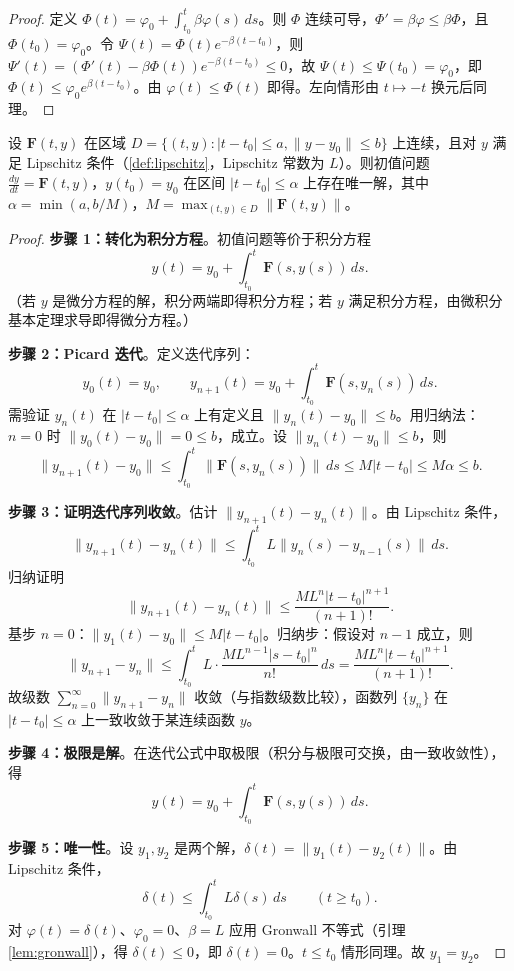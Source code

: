 \begin{proof}
定义 $\Phi(t) = \varphi_0 + \int_{t_0}^t \beta \varphi(s)\,ds$。则 $\Phi$ 连续可导，$\Phi' = \beta \varphi \le \beta \Phi$，且 $\Phi(t_0) = \varphi_0$。令 $\Psi(t) = \Phi(t) e^{-\beta(t-t_0)}$，则 $\Psi'(t) = (\Phi'(t) - \beta\Phi(t)) e^{-\beta(t-t_0)} \le 0$，故 $\Psi(t) \le \Psi(t_0) = \varphi_0$，即 $\Phi(t) \le \varphi_0 e^{\beta(t-t_0)}$。由 $\varphi(t) \le \Phi(t)$ 即得。左向情形由 $t \mapsto -t$ 换元后同理。
\end{proof}

\begin{theorem}\label{thm:picard_lindelof}
设 $\mathbf{F}(t, y)$ 在区域 $D = \{(t, y) : |t-t_0| \le a, \|y - y_0\| \le b\}$ 上连续，且对 $y$ 满足 Lipschitz 条件（\cref{def:lipschitz}，Lipschitz 常数为 $L$）。则初值问题 $\frac{dy}{dt} = \mathbf{F}(t, y)$，$y(t_0) = y_0$ 在区间 $|t-t_0| \le \alpha$ 上存在唯一解，其中 $\alpha = \min(a, b/M)$，$M = \max_{(t,y)\in D} \|\mathbf{F}(t,y)\|$。
\end{theorem}

\begin{proof}
\textbf{步骤 1：转化为积分方程}。初值问题等价于积分方程
\[
y(t) = y_0 + \int_{t_0}^t \mathbf{F}(s, y(s))\,ds.
\]
（若 $y$ 是微分方程的解，积分两端即得积分方程；若 $y$ 满足积分方程，由微积分基本定理求导即得微分方程。）

\textbf{步骤 2：Picard 迭代}。定义迭代序列：
\[
y_0(t) = y_0, \qquad y_{n+1}(t) = y_0 + \int_{t_0}^t \mathbf{F}(s, y_n(s))\,ds.
\]
需验证 $y_n(t)$ 在 $|t-t_0| \le \alpha$ 上有定义且 $\|y_n(t) - y_0\| \le b$。用归纳法：$n=0$ 时 $\|y_0(t)-y_0\|=0\le b$，成立。设 $\|y_n(t) - y_0\| \le b$，则
\[
\|y_{n+1}(t) - y_0\| \le \int_{t_0}^t \|\mathbf{F}(s, y_n(s))\|\,ds \le M |t - t_0| \le M\alpha \le b.
\]

\textbf{步骤 3：证明迭代序列收敛}。估计 $\|y_{n+1}(t) - y_n(t)\|$。由 Lipschitz 条件，
\[
\|y_{n+1}(t) - y_n(t)\| \le \int_{t_0}^t L\|y_n(s) - y_{n-1}(s)\|\,ds.
\]
归纳证明
\[
\|y_{n+1}(t) - y_n(t)\| \le \frac{M L^n |t - t_0|^{n+1}}{(n+1)!}.
\]
基步 $n=0$：$\|y_1(t) - y_0\| \le M|t-t_0|$。归纳步：假设对 $n-1$ 成立，则
\[
\|y_{n+1} - y_n\| \le \int_{t_0}^t L \cdot \frac{M L^{n-1} |s-t_0|^n}{n!}\,ds = \frac{M L^n |t-t_0|^{n+1}}{(n+1)!}.
\]
故级数 $\sum_{n=0}^{\infty} \|y_{n+1} - y_n\|$ 收敛（与指数级数比较），函数列 $\{y_n\}$ 在 $|t-t_0| \le \alpha$ 上一致收敛于某连续函数 $y$。

\textbf{步骤 4：极限是解}。在迭代公式中取极限（积分与极限可交换，由一致收敛性），得
\[
y(t) = y_0 + \int_{t_0}^t \mathbf{F}(s, y(s))\,ds.
\]

\textbf{步骤 5：唯一性}。设 $y_1, y_2$ 是两个解，$\delta(t) = \|y_1(t) - y_2(t)\|$。由 Lipschitz 条件，
\[
\delta(t) \le \int_{t_0}^t L\delta(s)\,ds \qquad (t \ge t_0).
\]
对 $\varphi(t) = \delta(t)$、$\varphi_0 = 0$、$\beta = L$ 应用 Gronwall 不等式（引理 \ref{lem:gronwall}），得 $\delta(t) \le 0$，即 $\delta(t) = 0$。$t \le t_0$ 情形同理。故 $y_1 = y_2$。
\end{proof}

